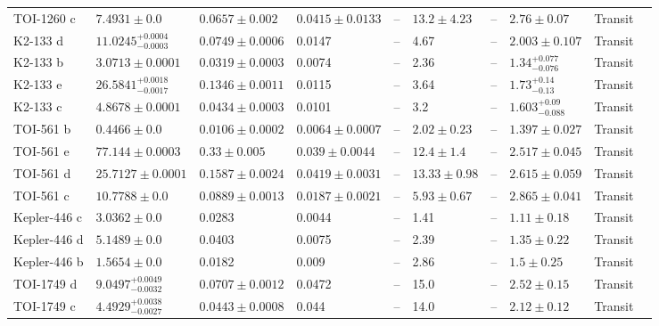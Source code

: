 \begin{tabular}{llllllllll}
TOI-1260 c & $7.4931 \pm 0.0$ & $0.0657 \pm 0.002$ & $0.0415 \pm 0.0133$ & -- & $13.2 \pm 4.23$ & -- & $2.76 \pm 0.07$ & Transit & \cite{LAM_ET_AL_2023} \\
K2-133 d & $11.0245^{+0.0004}_{-0.0003}$ & $0.0749 \pm 0.0006$ & 0.0147 & -- & 4.67 & -- & $2.003 \pm 0.107$ & Transit & \cite{WELLS_ET_AL__2019} \\
K2-133 b & $3.0713 \pm 0.0001$ & $0.0319 \pm 0.0003$ & 0.0074 & -- & 2.36 & -- & $1.34^{+0.077}_{-0.076}$ & Transit & \cite{WELLS_ET_AL__2019} \\
K2-133 e & $26.5841^{+0.0018}_{-0.0017}$ & $0.1346 \pm 0.0011$ & 0.0115 & -- & 3.64 & -- & $1.73^{+0.14}_{-0.13}$ & Transit & \cite{WELLS_ET_AL__2019} \\
K2-133 c & $4.8678 \pm 0.0001$ & $0.0434 \pm 0.0003$ & 0.0101 & -- & 3.2 & -- & $1.603^{+0.09}_{-0.088}$ & Transit & \cite{WELLS_ET_AL__2019} \\
TOI-561 b & $0.4466 \pm 0.0$ & $0.0106 \pm 0.0002$ & $0.0064 \pm 0.0007$ & -- & $2.02 \pm 0.23$ & -- & $1.397 \pm 0.027$ & Transit & \cite{PIOTTO_ET_AL__2024} \\
TOI-561 e & $77.144 \pm 0.0003$ & $0.33 \pm 0.005$ & $0.039 \pm 0.0044$ & -- & $12.4 \pm 1.4$ & -- & $2.517 \pm 0.045$ & Transit & \cite{PIOTTO_ET_AL__2024} \\
TOI-561 d & $25.7127 \pm 0.0001$ & $0.1587 \pm 0.0024$ & $0.0419 \pm 0.0031$ & -- & $13.33 \pm 0.98$ & -- & $2.615 \pm 0.059$ & Transit & \cite{PIOTTO_ET_AL__2024} \\
TOI-561 c & $10.7788 \pm 0.0$ & $0.0889 \pm 0.0013$ & $0.0187 \pm 0.0021$ & -- & $5.93 \pm 0.67$ & -- & $2.865 \pm 0.041$ & Transit & \cite{PIOTTO_ET_AL__2024} \\
Kepler-446 c & $3.0362 \pm 0.0$ & 0.0283 & 0.0044 & -- & 1.41 & -- & $1.11 \pm 0.18$ & Transit & \cite{MUIRHEAD_ET_AL__2015} \\
Kepler-446 d & $5.1489 \pm 0.0$ & 0.0403 & 0.0075 & -- & 2.39 & -- & $1.35 \pm 0.22$ & Transit & \cite{MUIRHEAD_ET_AL__2015} \\
Kepler-446 b & $1.5654 \pm 0.0$ & 0.0182 & 0.009 & -- & 2.86 & -- & $1.5 \pm 0.25$ & Transit & \cite{MUIRHEAD_ET_AL__2015} \\
TOI-1749 d & $9.0497^{+0.0049}_{-0.0032}$ & $0.0707 \pm 0.0012$ & 0.0472 & -- & 15.0 & -- & $2.52 \pm 0.15$ & Transit & \cite{FUKUI_ET_AL__2021} \\
TOI-1749 c & $4.4929^{+0.0038}_{-0.0027}$ & $0.0443 \pm 0.0008$ & 0.044 & -- & 14.0 & -- & $2.12 \pm 0.12$ & Transit & \cite{FUKUI_ET_AL__2021} \\

\end{tabular}
